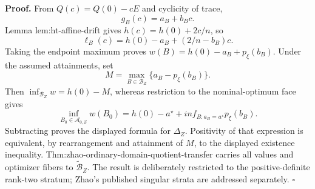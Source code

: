 \textbf{Proof.}
From \(Q(c)=Q(0)-cE\) and cyclicity of trace,
\[
g_B(c)=a_B+b_Bc.
\tag{1}
\]
Lemma lem:ht-affine-drift gives \(h(c)=h(0)+2c/n\), so
\[
\ell_B(c)=h(0)-a_B+(2/n-b_B)c.
\]
Taking the endpoint maximum proves \(w(B)=h(0)-a_B+p_\xi(b_B)\).  Under the assumed attainments, set
\[
M=\max_{B\in\mathcal B_Z}\{a_B-p_\xi(b_B)\}.
\]
Then \(\inf_{\mathcal B_Z}w=h(0)-M\), whereas restriction to the nominal-optimum face gives
\[
\inf_{B_0\in\mathcal A_{0,Z}}w(B_0)
=h(0)-a^\star+inf_{B:a_B=a^\star}p_\xi(b_B).
\]
Subtracting proves the displayed formula for \(\Delta_Z\).  Positivity of that expression is equivalent, by rearrangement and attainment of \(M\), to the displayed existence inequality.  Thm:zhao-ordinary-domain-quotient-transfer carries all values and optimizer fibers to \(\widetilde{\mathcal B}_Z\).  The result is deliberately restricted to the positive-definite rank-two stratum; Zhao's published singular strata are addressed separately. \(\square\)